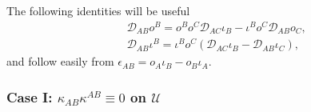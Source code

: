\documentclass[10pt,a4paper]{article}
\theoremstyle{plain}
\begin{document}
The following identities will be useful
\begin{subequations}
\begin{eqnarray}
&& \mathcal{D}_{AB}o^B = o^Bo^C\mathcal{D}_{AC}\iota_B - \iota^B o^C\mathcal{D}_{AB}o_C,\\
&& \mathcal{D}_{AB}\iota^B = \iota^B o^C(\mathcal{D}_{AC}\iota_B - \mathcal{D}_{AB}\iota_C),
\end{eqnarray}
\end{subequations}
and follow easily from $\epsilon_{AB}=o_A\iota_B - o_B\iota_A$. 

\subsubsection{Case I: $\kappa_{AB}\kappa^{AB}\equiv 0$ on $\mathcal{U}$} \label{TypeNCase}
\end{document}
